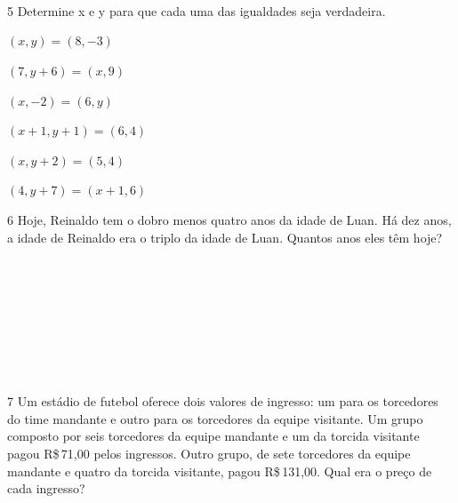\\
\\
\\

\num{5} Determine x e y para que cada uma das igualdades seja verdadeira.

\begin{escolha}[itemsep=0pt]
\item $(x, y ) = ( 8, -3)$
\item $(7, y + 6) = (x, 9)$
\item $(x, -2) = (6, y)$
\item $(x + 1, y + 1) = (6, 4)$
\item $(x, y + 2) = (5, 4)$
\item $(4, y + 7) = (x + 1, 6)$
\end{escolha}

\num{6} Hoje, Reinaldo tem o dobro menos quatro anos da idade de Luan. Há dez
anos, a idade de Reinaldo era o triplo da idade de Luan. Quantos anos
eles têm hoje?

\\
\\
\\
\\
\\
\\
\\

\pagebreak

\num{7} Um estádio de futebol oferece dois valores de ingresso: um para os
torcedores do time mandante e outro para os torcedores da equipe visitante. Um
grupo composto por seis torcedores da equipe mandante e um da torcida
visitante pagou R\$\,71,00 pelos ingressos. Outro grupo, de sete torcedores da
equipe mandante e quatro da torcida visitante, pagou R\$\,131,00. Qual era o
preço de cada ingresso?

